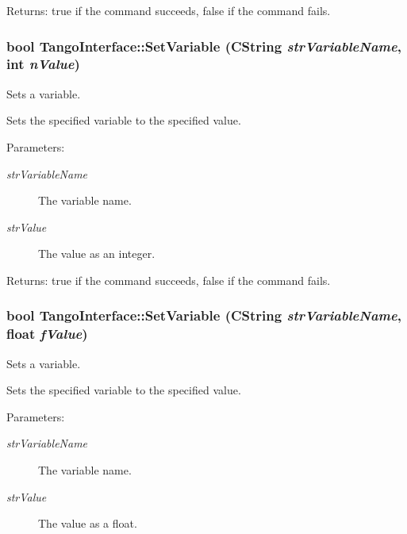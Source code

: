 \begin{Desc}
\item[Returns:]true if the command succeeds, false if the command fails. \end{Desc}
\hypertarget{classTangoInterface_ded717121a0c221a3b7528d221d24657}{
\subsubsection[SetVariable]{\setlength{\rightskip}{0pt plus 5cm}bool TangoInterface::SetVariable (CString {\em strVariableName}, \/  int {\em nValue})}}
\label{classTangoInterface_ded717121a0c221a3b7528d221d24657}


Sets a variable. 

Sets the specified variable to the specified value.

\begin{Desc}
\item[Parameters:]
\begin{description}
\item[{\em strVariableName}]The variable name. \item[{\em strValue}]The value as an integer. \end{description}
\end{Desc}


\begin{Desc}
\item[Returns:]true if the command succeeds, false if the command fails. \end{Desc}
\hypertarget{classTangoInterface_bbad345c34f9c25f013be3bbc02cfe96}{
\subsubsection[SetVariable]{\setlength{\rightskip}{0pt plus 5cm}bool TangoInterface::SetVariable (CString {\em strVariableName}, \/  float {\em fValue})}}
\label{classTangoInterface_bbad345c34f9c25f013be3bbc02cfe96}


Sets a variable. 

Sets the specified variable to the specified value.

\begin{Desc}
\item[Parameters:]
\begin{description}
\item[{\em strVariableName}]The variable name. \item[{\em strValue}]The value as a float. \end{description}
\end{Desc}


